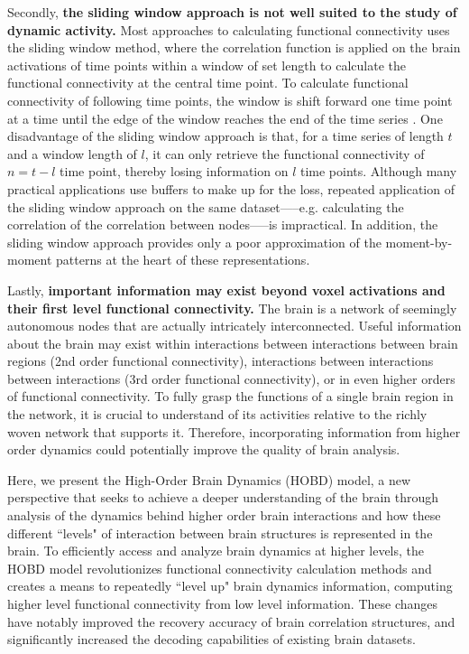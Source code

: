 \documentclass[11pt]{article}
\begin{document}
Secondly, \textbf{the sliding window approach is not well suited to the study of dynamic activity.} Most approaches to calculating functional connectivity uses the sliding window method, where the correlation function is applied on the brain activations of time points within a window of set length to calculate the functional connectivity at the central time point. To calculate functional connectivity of following time points, the window is shift forward one time point at a time until the edge of the window reaches the end of the time series \cite{enrico2011}\cite{elena2012}. One disadvantage of the sliding window approach is that, for a time series of length $t$ and a window length of $l$, it can only retrieve the functional connectivity of $n=t-l$ time point, thereby losing information on $l$ time points. Although many practical applications use buffers to make up for the loss, repeated application of the sliding window approach on the same dataset—--e.g. calculating the correlation of the correlation between nodes—--is impractical. In addition, the sliding window approach provides only a poor approximation of the moment-by-moment patterns at the heart of these representations.

Lastly, \textbf{important information may exist beyond voxel activations and their first level functional connectivity.} The brain is a network of seemingly autonomous nodes that are actually intricately interconnected. Useful information about the brain may exist within interactions between interactions between brain regions (2nd order functional connectivity), interactions between interactions between interactions (3rd order functional connectivity), or in even higher orders of functional connectivity. To fully grasp the functions of a single brain region in the network, it is crucial to understand of its activities relative to the richly woven network that supports it. Therefore, incorporating information from higher order dynamics could potentially improve the quality of brain analysis.

Here, we present the High-Order Brain Dynamics (HOBD) model, a new perspective that seeks to achieve a deeper understanding of the brain through analysis of the dynamics behind higher order brain interactions and how these different ``levels" of interaction between brain structures is represented in the brain. To efficiently access and analyze brain dynamics at higher levels, the HOBD model revolutionizes functional connectivity calculation methods and creates a means to repeatedly ``level up" brain dynamics information, computing higher level functional connectivity from low level information. These changes have notably improved the recovery accuracy of brain correlation structures, and significantly increased the decoding capabilities of existing brain datasets.
\end{document}
